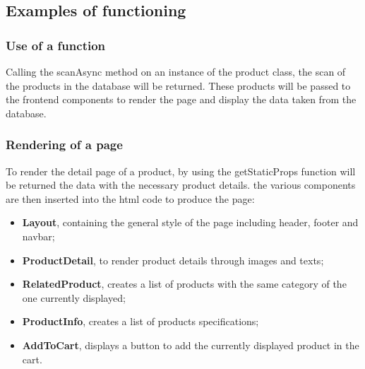 \subsection{Examples of functioning}
\subsubsection{Use of a function}
Calling the scanAsync method on an instance of the product class, the scan of the products in the database will be returned. These products will be passed to the frontend components to render the page and display the data taken from the database.
\subsubsection{Rendering of a page}
To render the detail page of a product, by using the getStaticProps function will be returned the data with the necessary product details. the various components are then inserted into the html code to produce the page:
\begin{itemize}
  \item \textbf{Layout}, containing the general style of the page including header, footer and navbar;
  \item \textbf{ProductDetail}, to render product details through images and texts;
  \item \textbf{RelatedProduct}, creates a list of products with the same category of the one currently displayed;
  \item \textbf{ProductInfo}, creates a list of products specifications;
  \item \textbf{AddToCart}, displays a button to add the currently displayed product in the cart.
\end{itemize}

